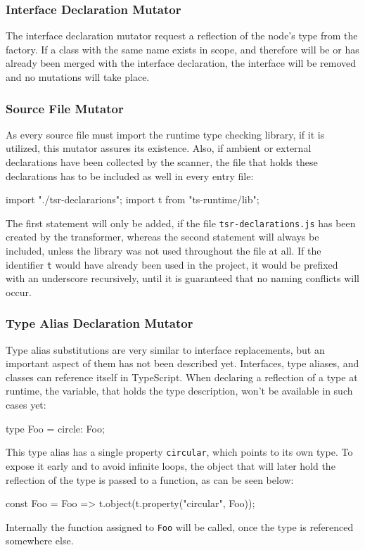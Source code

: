 
\subsubsection{Interface Declaration Mutator}

The interface declaration mutator request a reflection of the node's type from the factory. If a class with the same name exists in scope, and therefore will be or has already been merged with the interface declaration, the interface will be removed and no mutations will take place.

\subsubsection{Source File Mutator}

As every source file must import the runtime type checking library, if it is utilized, this mutator assures its existence. Also, if ambient or external declarations have been collected by the scanner, the file that holds these declarations has to be included as well in every entry file:
\begin{JsCode}[numbers=none]
import "./tsr-declararions";
import t from "ts-runtime/lib";  
\end{JsCode}
The first statement will only be added, if the file \texttt{tsr-declarations.js} has been created by the transformer, whereas the second statement will always be included, unless the library was not used throughout the file at all. If the identifier \texttt{t} would have already been used in the project, it would be prefixed with an underscore recursively, until it is guaranteed that no naming conflicts will occur. 

\subsubsection{Type Alias Declaration Mutator}

Type alias substitutions are very similar to interface replacements, but an important aspect of them has not been described yet. Interfaces, type aliases, and classes can reference itself in TypeScript. When declaring a reflection of a type at runtime, the variable, that holds the type description, won't be available in such cases yet:
\begin{JsCode}[numbers=none]
type Foo = { circle: Foo; }  
\end{JsCode}
This type alias has a single property \texttt{circular}, which points to its own type. To expose it early and to avoid infinite loops, the object that will later hold the reflection of the type is passed to a function, as can be seen below:
\begin{JsCode}[numbers=none]
const Foo = Foo => t.object(t.property("circular", Foo));
\end{JsCode}
Internally the function assigned to \texttt{Foo} will be called, once the type is referenced somewhere else.

